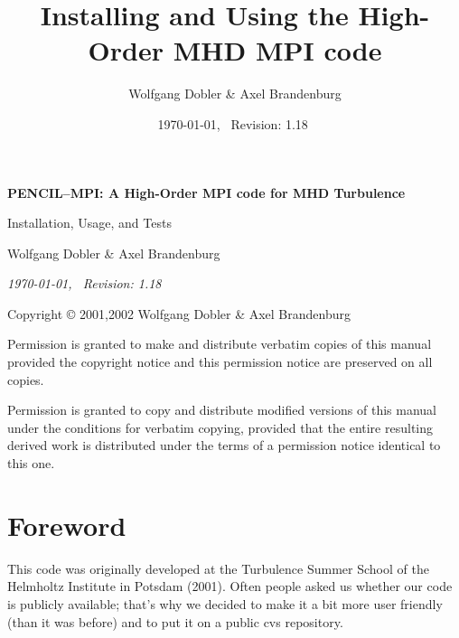 \documentclass[12pt,twoside,notitlepage,a4paper]{article}
\title{{\sffamily\bfseries Installing and Using the High-Order MHD MPI code}}
\author{Wolfgang Dobler \& Axel Brandenburg}
\date{\today,~ $ $Revision: 1.18 $ $}
\begin{document}
\pagestyle{empty}


\begin{titlepage}
  \begin{center}

  \large

  \vspace*{3cm}

  {\Large\sffamily\bfseries PENCIL--MPI: A High-Order MPI code for MHD Turbulence}

  \vspace{0.5cm}

  {\sffamily Installation, Usage, and Tests}

  \vspace{1.5cm}

  {Wolfgang Dobler \& Axel Brandenburg}


  \vspace{2cm}

  \emph{\today,~ $ $Revision: 1.18 $ $}


\end{center}

\end{titlepage}


\newpage
\mbox{}
\vfill

Copyright \copyright{} 2001,2002 Wolfgang Dobler \& Axel Brandenburg
\bigskip

Permission is granted to make and distribute verbatim copies of
this manual provided the copyright notice and this permission notice
are preserved on all copies.

Permission is granted to copy and distribute modified versions
of this manual under the conditions for verbatim copying,
provided that the entire resulting derived work is distributed under the
terms of a permission notice identical to this one.


\clearpage
\pagestyle{plain}

\section*{Foreword}

This code was originally developed at the Turbulence Summer School of the
Helmholtz Institute in Potsdam (2001).
Often people asked us whether our code is publicly available;
that's why we decided to make it a bit more user friendly (than it was before)
and to put it on a public cvs repository.
\end{document}
